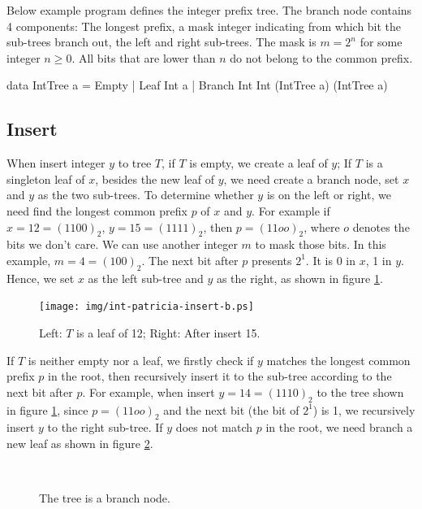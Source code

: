 \documentclass[b5paper]{article}
\begin{document}
Below example program defines the integer prefix tree. The branch node contains 4 components: The longest prefix, a mask integer indicating from which bit the sub-trees branch out, the left and right sub-trees. The mask is $m = 2^n$ for some integer $n \geq 0$. All bits that are lower than $n$ do not belong to the common prefix.

\begin{Haskell}
data IntTree a = Empty
               | Leaf Int a
               | Branch Int Int (IntTree a) (IntTree a)
\end{Haskell}

\subsection{Insert}
When insert integer $y$ to tree $T$, if $T$ is empty, we create a leaf of $y$; If $T$ is a singleton leaf of $x$, besides the new leaf of $y$, we need create a branch node, set $x$ and $y$ as the two sub-trees. To determine whether $y$ is on the left or right, we need find the longest common prefix $p$ of $x$ and $y$. For example if $x = 12 = (1100)_2$, $y = 15 = (1111)_2$, then $p = (11oo)_2$, where $o$ denotes the bits we don't care. We can use another integer $m$ to mask those bits. In this example, $m = 4 = (100)_2$. The next bit after $p$ presents $2^1$. It is 0 in $x$, 1 in $y$. Hence, we set $x$ as the left sub-tree and $y$ as the right, as shown in figure \ref{fig:int-patricia-insert-b}.

\begin{figure}[htbp]
  \centering
  \texttt{[image: img/int-patricia-insert-b.ps]}
  \caption{Left: $T$ is a leaf of 12; Right: After insert 15.}
  \label{fig:int-patricia-insert-b}
\end{figure}

If $T$ is neither empty nor a leaf, we firstly check if $y$ matches the longest common prefix $p$ in the root, then recursively insert it to the sub-tree according to the next bit after $p$. For example, when insert $y = 14 = (1110)_2$ to the tree shown in figure \ref{fig:int-patricia-insert-b}, since $p = (11oo)_2$ and the next bit (the bit of $2^1$) is 1, we recursively insert $y$ to the right sub-tree. If $y$ does not match $p$ in the root, we need branch a new leaf as shown in figure \ref{fig:int-patricia-insert-c}.

\begin{figure}[htbp]
  \centering
  \\
  \caption{The tree is a branch node.}
  \label{fig:int-patricia-insert-c}
\end{figure}
\end{document}
